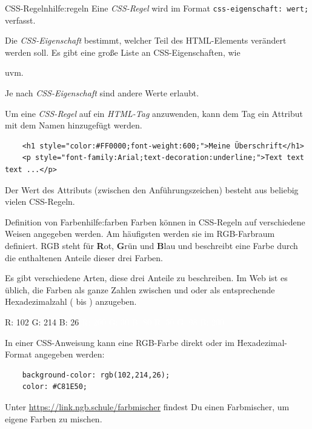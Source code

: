 \documentclass[lerntheke,12pt,a5paper,landscape]{arbeitsblatt}
\begin{document}
\begin{hilfekarte}{CSS-Regeln}{hilfe:regeln}
	Eine \emph{CSS-Regel} wird im Format \texttt{css-eigenschaft: wert;} verfasst.

	Die \emph{CSS-Eigenschaft} bestimmt, welcher Teil des HTML-Elements verändert werden soll. Es gibt eine große Liste an CSS-Eigenschaften, wie
	\begin{smallitem}
		\item {}
		\item {}
		\item {}
		\item {}
		\item uvm.
	\end{smallitem}

	Je nach \emph{CSS-Eigenschaft} sind andere Werte erlaubt.
\end{hilfekarte}

\begin{loesungskarte}
	Um eine \emph{CSS-Regel} auf ein \emph{HTML-Tag} anzuwenden, kann dem Tag ein Attribut mit dem Namen  hinzugefügt werden.

	\begin{verbatim}
	<h1 style="color:#FF0000;font-weight:600;">Meine Überschrift</h1>
	<p style="font-family:Arial;text-decoration:underline;">Text text text ...</p>
	\end{verbatim}

	Der Wert des Attributs (zwischen den Anführungszeichen) besteht aus beliebig vielen CSS-Regeln.
\end{loesungskarte}

\begin{hilfekarte}{Definition von Farben}{hilfe:farben}
	Farben können in CSS-Regeln auf verschiedene Weisen angegeben werden. Am häufigsten werden sie im RGB-Farbraum definiert. RGB steht für \textbf{R}ot, \textbf{G}rün und \textbf{B}lau und beschreibt eine Farbe durch die enthaltenen Anteile dieser drei Farben.

	Es gibt verschiedene Arten, diese drei Anteile zu beschreiben. Im Web ist es üblich, die Farben als ganze Zahlen zwischen  und  oder als entsprechende Hexadezimalzahl ( bis ) anzugeben.

	\begin{center}
		\colorbox[RGB]{102,214,26}{R: 102 G: 214 B: 26} \qquad \colorbox[RGB]{200,30,80}{\textcolor{white}{R: 200 G: 30 B: 80}} \qquad \colorbox[RGB]{50,98,200}{\textcolor{white}{R: 50 G: 98 B: 200}}
	\end{center}

	In einer CSS-Anweisung kann eine RGB-Farbe direkt oder im Hexadezimal-Format angegeben werden:
	\begin{verbatim}
	background-color: rgb(102,214,26);
	color: #C81E50;
	\end{verbatim}

	Unter \url{https://link.ngb.schule/farbmischer} findest Du einen Farbmischer, um eigene Farben zu mischen.
\end{hilfekarte}
\end{document}
